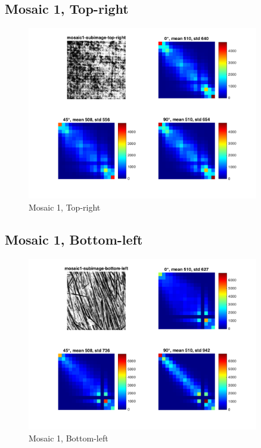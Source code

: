 \documentclass[a4paper,12pt,titlepage]{article}
\begin{document}
\subsection{Mosaic 1, Top-right}
\begin{figure}[H]
\includegraphics[width=0.9\textwidth]{partB-mosaic1-subimage-top-right}
\caption{Mosaic 1, Top-right}
\label{fig:Mosaic1SubimageTopRight}
\end{figure}

\subsection{Mosaic 1, Bottom-left}
\begin{figure}[H]
\includegraphics[width=0.9\textwidth]{partB-mosaic1-subimage-bottom-left}
\caption{Mosaic 1, Bottom-left}
\label{fig:Mosaic1SubimageBottomLeft}
\end{figure}
\end{document}
